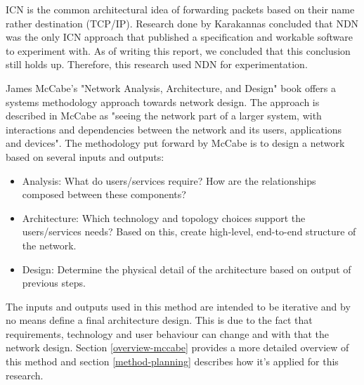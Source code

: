 ICN is the common architectural idea of forwarding packets based on their name rather destination (TCP/IP). Research done by Karakannas \cite{icn-bd} concluded that NDN was the only ICN approach that published a specification and workable software to experiment with. As of writing this report, we concluded that this conclusion still holds up. Therefore, this research used NDN for experimentation.

James McCabe's "Network Analysis, Architecture, and Design" \cite{mccabe2010network} book offers a systems methodology approach towards network design. The approach is described in McCabe as "seeing the network part of a larger system, with interactions and dependencies between the network and its users, applications and devices". The methodology put forward by McCabe is to design a network based on several inputs and outputs:
\begin{itemize}
    \item Analysis: What do users/services require? How are the relationships composed between these components?
    \item Architecture: Which technology and topology choices support the users/services needs? Based on this, create high-level, end-to-end structure of the network.
    \item Design: Determine the physical detail of the architecture based on output of previous steps.
\end{itemize}

The inputs and outputs used in this method are intended to be iterative and by no means define a final architecture design. This is due to the fact that requirements, technology and user behaviour can change and with that the network design. Section \ref{overview-mccabe} provides a more detailed overview of this method and section \ref{method-planning} describes how it's applied for this research.

